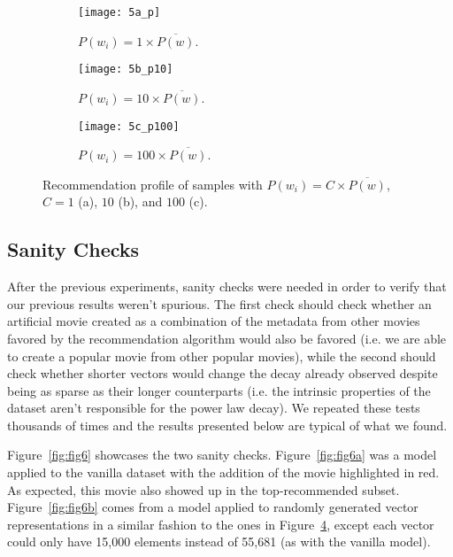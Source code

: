 \begin{figure}
  \centering
  \begin{subfigure}{0.3\textwidth}
    \centering
    \texttt{[image: 5a\_p]}
    \caption{$P(w_{i}) = 1 \times \overline{P(w)}$.\label{fig:fig5a}}
  \end{subfigure}
  \begin{subfigure}{0.3\textwidth}
    \centering
    \texttt{[image: 5b\_p10]}
    \caption{$P(w_{i}) = 10 \times \overline{P(w)}$.\label{fig:fig5b}}
  \end{subfigure}
  \begin{subfigure}{0.3\textwidth}
    \centering
    \texttt{[image: 5c\_p100]}
    \caption{$P(w_{i}) = 100 \times \overline{P(w)}$.\label{fig:fig5c}}
  \end{subfigure}
  \caption{Recommendation profile of samples with
    $P(w_{i}) = C \times \overline{P(w)}$, $C = 1$ (a), $10$ (b), and $100$
    (c).\label{fig:fig5}}
\end{figure}

\subsection{Sanity Checks}
\label{subsec:sanity03}

After the previous experiments, sanity checks were needed in order to verify
that our previous results weren't spurious. The first check should check whether
an artificial movie created as a combination of the metadata from other movies
favored by the recommendation algorithm would also be favored (i.e. we are able
to create a popular movie from other popular movies), while the second should
check whether shorter vectors would change the decay already observed despite
being as sparse as their longer counterparts (i.e. the intrinsic properties of
the dataset aren't responsible for the power law decay). We repeated these tests
thousands of times and the results presented below are typical of what we found.

Figure~\ref{fig:fig6} showcases the two sanity checks. Figure~\ref{fig:fig6a}
was a model applied to the vanilla dataset with the addition of the movie
highlighted in red. As expected, this movie also showed up in the
top-recommended subset. Figure~\ref{fig:fig6b} comes from a model applied to
randomly generated vector representations in a similar fashion to the ones in
Figure~\ref{fig:fig5}, except each vector could only have 15,000 elements
instead of 55,681 (as with the vanilla model).

